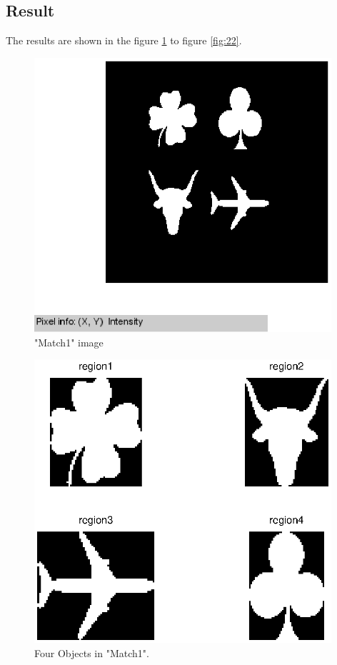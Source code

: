 \documentclass[paper=a4, fontsize=11pt]{scrartcl}
\begin{document}
\subsection{ Result }

The results are shown in the figure \ref{fig:15} to figure \ref{fig:22}.
 
\begin{figure}
	\centering
	\includegraphics[width=11cm]{match1.eps}
	\caption{"Match1" image}
	\label{fig:15}
\end{figure}

\begin{figure}
	\centering
	\includegraphics[width=11cm]{original4object.eps}
	\caption{Four Objects in "Match1". }
	\label{fig:16}
\end{figure}
\end{document}
